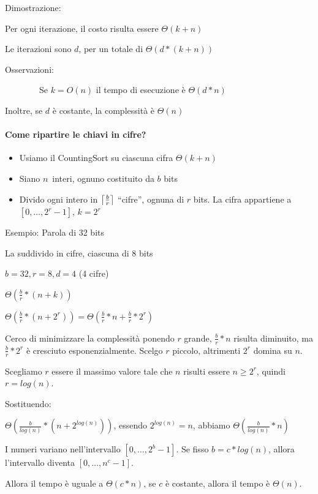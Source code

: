 \documentclass[11pt,a4paper,twoside,openright]{book}
\DeclarePairedDelimiter\ceil{\lceil}{\rceil}
\providecommand{\tightlist}{\setlength{\itemsep}{0pt}\setlength{\parskip}{0pt}}
\let\oldparagraph\paragraph
\renewcommand{\paragraph}[1]{\oldparagraph{#1}\mbox{}}
\begin{document}
{Dimostrazione:}

{Per ogni iterazione, il costo risulta essere $\Theta(k+n)$}

{Le iterazioni sono $d$, per un totale di $\Theta(d*(k+n))$}

{Osservazioni:}

{~~~~~~~~Se $k=O(n)$ il tempo di esecuzione è $\Theta(d*n)$}

{Inoltre, se $d$ è costante, la complessità è $\Theta(n)$}

\paragraph{Come ripartire le chiavi in cifre?}

\begin{itemize}
\tightlist
\item
  {Usiamo il CountingSort su ciascuna cifra $\Theta(k+n)$}
\item
  {Siano }$n${~interi, ognuno costituito da $b$ bits}
\item
  {Divido ogni intero in $\ceil*{\frac{b}{r}}$ ``cifre'', ognuna di $r$ bits. La cifra appartiene a $[0,\ldots,2^r-1]$, $k=2^r$}
\end{itemize}

{Esempio: Parola di 32 bits}

{La suddivido in cifre, ciascuna di 8 bits}

$b=32, r=8, d=4$ (4 cifre)

$\Theta(\frac{b}{r}*(n+k))$

$\Theta(\frac{b}{r}*(n+2^r)) = \Theta(\frac{b}{r}*n + \frac{b}{r}*2^r)$

{Cerco di minimizzare la complessità ponendo $r$ grande, $\frac{b}{r}*n$ risulta diminuito, ma $\frac{b}{r}*2^r$ è cresciuto esponenzialmente. Scelgo $r$ piccolo, altrimenti $2^r$ domina su $n$.}

{Scegliamo $r$ essere il massimo valore tale che $n$ risulti essere $n\geq 2^r$, quindi $r=log(n)$.}

{Sostituendo:}

{$\Theta(\frac{b}{log(n)}*(n+2^{log(n)}))$, essendo $2^{log(n)} = n$, abbiamo $\Theta(\frac{b}{log(n)}*n)$}

{I numeri variano nell'intervallo $[0,\ldots,2^b-1]$. Se fisso $b=c*log(n)$, allora l'intervallo diventa $[0,\ldots,n^c-1]$.}

{Allora il tempo è uguale a $\Theta(c*n)$, se $c$ è costante, allora il tempo è $\Theta(n)$.}
\end{document}
